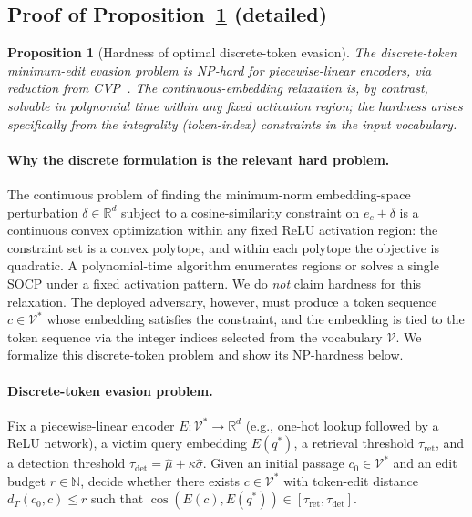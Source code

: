 \documentclass{article}
\newtheorem{proposition}[theorem]{Proposition}
\theoremstyle{definition}
\newcommand{\RR}{\mathbb{R}}
\newcommand{\NN}{\mathbb{N}}
\newcommand{\cV}{\mathcal{V}}
\newcommand{\enc}{E}
\DeclareMathOperator{\cosim}{cos}
\begin{document}
\subsection{Proof of Proposition~\ref{prop:hardness} (detailed)}
\label{app:proof_hardness}

\begin{proposition}[Hardness of optimal discrete-token evasion]
\label{prop:hardness}
The \emph{discrete-token} minimum-edit evasion problem is NP-hard for piecewise-linear encoders, via reduction from CVP~\citep{micciancio2001hardness}. The continuous-embedding relaxation is, by contrast, solvable in polynomial time within any fixed activation region; the hardness arises specifically from the integrality (token-index) constraints in the input vocabulary.
\end{proposition}

\paragraph{Why the discrete formulation is the relevant hard problem.} The continuous problem of finding the minimum-norm embedding-space perturbation $\delta \in \RR^d$ subject to a cosine-similarity constraint on $e_c + \delta$ is a continuous convex optimization within any fixed ReLU activation region: the constraint set is a convex polytope, and within each polytope the objective is quadratic. A polynomial-time algorithm enumerates regions or solves a single SOCP under a fixed activation pattern. We do \emph{not} claim hardness for this relaxation. The deployed adversary, however, must produce a token sequence $c \in \cV^*$ whose embedding satisfies the constraint, and the embedding is tied to the token sequence via the integer indices selected from the vocabulary $\cV$. We formalize this discrete-token problem and show its NP-hardness below.

\paragraph{Discrete-token evasion problem.} Fix a piecewise-linear encoder $\enc : \cV^* \to \RR^d$ (e.g., one-hot lookup followed by a ReLU network), a victim query embedding $\enc(q^*)$, a retrieval threshold $\tau_{\text{ret}}$, and a detection threshold $\tau_{\text{det}} = \hat\mu + \kappa\hat\sigma$. Given an initial passage $c_0 \in \cV^*$ and an edit budget $r \in \NN$, decide whether there exists $c \in \cV^*$ with token-edit distance $d_T(c_0, c) \leq r$ such that $\cosim(\enc(c), \enc(q^*)) \in [\tau_{\text{ret}}, \tau_{\text{det}}]$.
\end{document}
